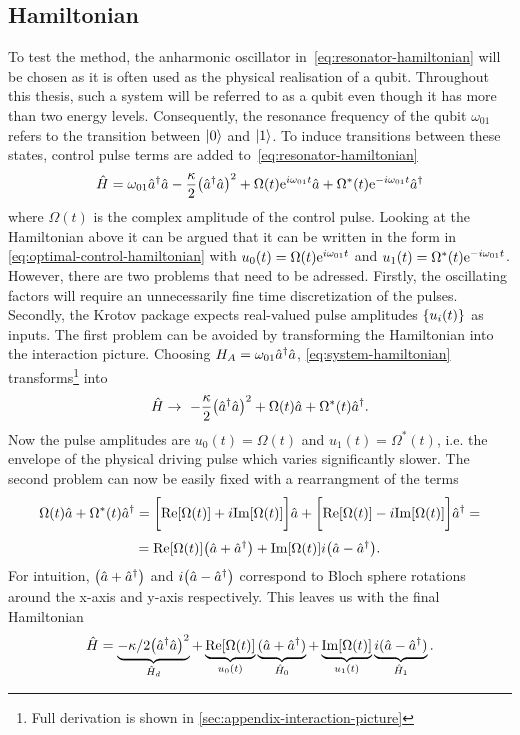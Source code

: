 \documentclass[main.tex]{subfiles}
\begin{document}
\subsection{Hamiltonian}
To test the method, the anharmonic oscillator in~\cref{eq:resonator-hamiltonian} will be chosen as it is often used as the physical realisation of a qubit.
Throughout this thesis, such a system will be referred to as a qubit even though it has more than two energy levels.
Consequently, the resonance frequency of the qubit \( \omega_{01} \) refers to the transition between \( \ket{0} \) and \( \ket{1} \).
To induce transitions between these states, control pulse terms are added to~\cref{eq:resonator-hamiltonian}
\begin{equation}
    \hat{H} = \omega_{01} \hat{a}^\dagger\hat{a} - \frac{\kappa}{2} \qty(\hat{a}^\dagger\hat{a})^2 + \Omega(t)\mathrm{e}^{i\omega_{01}t}\hat{a} + \Omega^*(t)\mathrm{e}^{-i\omega_{01}t}\hat{a}^\dagger
    \label{eq:system-hamiltonian}
\end{equation}
where \( \Omega(t) \) is the complex amplitude of the control pulse.
Looking at the Hamiltonian above it can be argued that it can be written in the form in \cref{eq:optimal-control-hamiltonian} with \( u_0(t) = \Omega(t)\mathrm{e}^{i\omega_{01}t} \) and \( u_1(t) = \Omega^*(t)\mathrm{e}^{-i\omega_{01}t} \).
However, there are two problems that need to be adressed.
Firstly, the oscillating factors will require an unnecessarily fine time discretization of the pulses.
Secondly, the Krotov package expects real-valued pulse amplitudes \( \qty{u_i(t)} \) as inputs.
The first problem can be avoided by transforming the Hamiltonian into the interaction picture.
Choosing \( H_A = \omega_{01} \hat{a}^\dagger\hat{a} \), \cref{eq:system-hamiltonian} transforms\footnote{Full derivation is shown in \cref{sec:appendix-interaction-picture}} into
\begin{equation}
    \hat{H} \rightarrow~ -\frac{\kappa}{2}\qty(\hat{a}^\dagger\hat{a})^2 + \Omega(t)\hat{a} + \Omega^*(t)\hat{a}^\dagger.
\end{equation}
Now the pulse amplitudes are \( u_0(t) = \Omega(t) \) and \( u_1(t) = \Omega^*(t) \), i.e. the envelope of the physical driving pulse which varies significantly slower.
The second problem can now be easily fixed with a rearrangment of the terms
\[ \Omega(t)\hat{a} + \Omega^*(t)\hat{a}^\dagger = \bigg[\text{Re}\qty[\Omega(t)]+i\text{Im}\qty[\Omega(t)]\bigg]\hat{a} + \bigg[\text{Re}\qty[\Omega(t)]-i\text{Im}\qty[\Omega(t)]\bigg]\hat{a}^\dagger = \]
\[ = \text{Re}\qty[\Omega(t)]\qty(\hat{a} + \hat{a}^\dagger) + \text{Im}\qty[\Omega(t)]i\qty(\hat{a} - \hat{a}^\dagger). \]
For intuition, \( \qty(\hat{a} + \hat{a}^\dagger) \) and \( i\qty(\hat{a} - \hat{a}^\dagger) \) correspond to Bloch sphere rotations around the x-axis and y-axis respectively. 
This leaves us with the final Hamiltonian
\begin{equation}
    \hat{H} = \underbrace{-\kappa/2\qty(\hat{a}^\dagger\hat{a})^2}_{\hat{H}_d} + \underbrace{\text{Re}\qty[\Omega(t)]}_{u_0(t)}\underbrace{(\hat{a} + \hat{a}^\dagger)}_{\hat{H}_0} + \underbrace{\text{Im}\qty[\Omega(t)]}_{u_1(t)}\underbrace{i(\hat{a} - \hat{a}^\dagger)}_{\hat{H}_1} .
    \label{eq:system-hamiltonian-rotating}
\end{equation}
\end{document}
